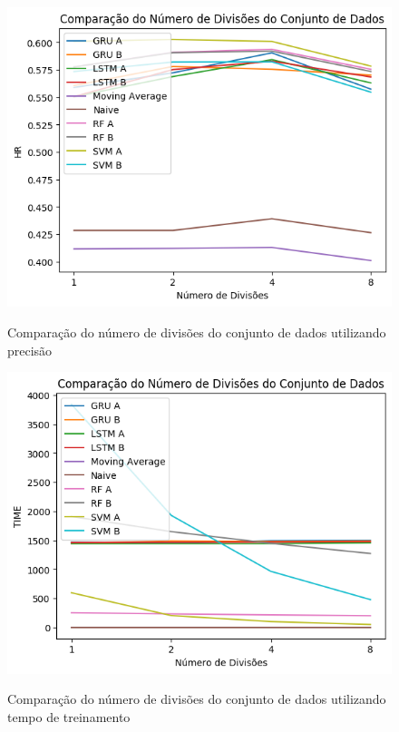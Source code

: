 \begin{figure}[htbp]
    \centering
    \includegraphics[scale=0.8]{monography/img/comparisons/comparacao_do_numero_de_divisoes_do_conjunto_de_dados_hr.png}
    \label{figure:numero_de_divisoes_do_conjunto_de_dados_hr}
    \caption{Comparação do número de divisões do conjunto de dados utilizando precisão}
\end{figure}

\begin{figure}[htbp]
    \centering
    \includegraphics[scale=0.8]{monography/img/comparisons/comparacao_do_numero_de_divisoes_do_conjunto_de_dados_time.png}
    \label{figure:numero_de_divisoes_do_conjunto_de_dados_time}
    \caption{Comparação do número de divisões do conjunto de dados utilizando tempo de treinamento}
\end{figure}

